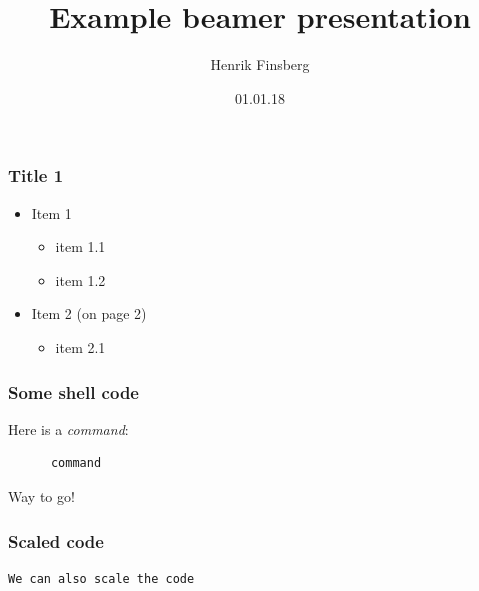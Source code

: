 \documentclass[mathserif, aspectratio=169]{beamer}
\title
{Example beamer presentation}
\author
{Henrik Finsberg}
\institute %
{
  Simula Research Laboratory
}
\date{01.01.18}
\begin{document}
\finsbergtitlepage
\begin{frame}
\titlepage
\end{frame}



\cleanpage
\begin{frame}
  \frametitle{Title 1}
  \begin{itemize}
  \item<1-> Item 1 
    \begin{itemize}
    \item item 1.1
    \item item 1.2
    \end{itemize}
  \item<2-> Item 2 (on page 2)
    \begin{itemize}
    \item item 2.1
    \end{itemize}
  \end{itemize}
  \end{frame}



\begin{frame}[fragile]
  \frametitle{Some shell code}
  \begin{block}{Here is a \textit{command}:}
    \begin{verbatim}
      command
    \end{verbatim}
  \end{block}

  Way to go!
    
\end{frame}

\begin{frame}[fragile]
  \frametitle{Scaled code}
  {\fontsize{2.4}{4} \selectfont
\begin{verbatim}
We can also scale the code
\end{verbatim}
    }
\end{frame}
\end{document}

